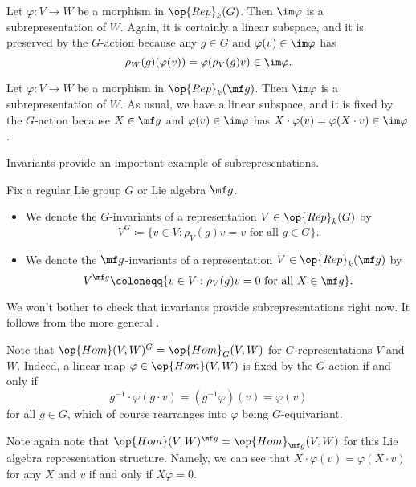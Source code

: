 \documentclass[../notes.tex]{subfiles}
\begin{document}
\begin{example} \label{ex:image-subrep}
	Let $\varphi\colon V\to W$ be a morphism in $\op{Rep}_k(G)$. Then $\im\varphi$ is a subrepresentation of $W$. Again, it is certainly a linear subspace, and it is preserved by the $G$-action because any $g\in G$ and $\varphi(v)\in\im\varphi$ has
	\[\rho_W(g)(\varphi(v))=\varphi(\rho_V(g)v)\in\im\varphi.\]
\end{example}
\begin{example} \label{ex:image-subrep-alg}
	Let $\varphi\colon V\to W$ be a morphism in $\op{Rep}_k(\mf g)$. Then $\im\varphi$ is a subrepresentation of $W$. As usual, we have a linear subspace, and it is fixed by the $G$-action because $X\in\mf g$ and $\varphi(v)\in\im\varphi$ has $X\cdot\varphi(v)=\varphi(X\cdot v)\in\im\varphi$.
\end{example}
Invariants provide an important example of subrepresentations.
\begin{definition}[invariants]
	Fix a regular Lie group $G$ or Lie algebra $\mf g$.
	\begin{itemize}
		\item We denote the $G$-invariants of a representation $V\in\op{Rep}_k(G)$ by
		\[V^G\coloneqq\{v\in V:\rho_V(g)v=v\text{ for all }g\in G\}.\]
		\item We denote the $\mf g$-invariants of a representation $V\in\op{Rep}_k(\mf g)$ by
		\[V^{\mf g}\coloneqq\{v\in V:\rho_V(g)v=0\text{ for all }X\in\mf g\}.\]
	\end{itemize}
\end{definition}
\begin{remark}
	We won't bother to check that invariants provide subrepresentations right now. It follows from the more general .
\end{remark}
\begin{example}
	Note that $\op{Hom}(V,W)^G=\op{Hom}_G(V,W)$ for $G$-representations $V$ and $W$. Indeed, a linear map $\varphi\in\op{Hom}(V,W)$ is fixed by the $G$-action if and only if
	\[g^{-1}\cdot\varphi(g\cdot v)=\left(g^{-1}\varphi\right)(v)=\varphi(v)\]
	for all $g\in G$, which of course rearranges into $\varphi$ being $G$-equivariant.
\end{example}
\begin{example}
	Note again note that $\op{Hom}(V,W)^{\mf g}=\op{Hom}_{\mf g}(V,W)$ for this Lie algebra representation structure. Namely, we can see that $X\cdot\varphi(v)=\varphi(X\cdot v)$ for any $X$ and $v$ if and only if $X\varphi=0$.
\end{example}
\end{document}
